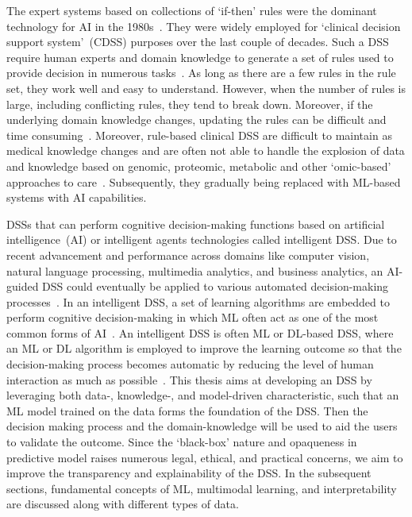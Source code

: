 \hspace*{3.5mm} The expert systems based on collections of `if-then' rules were the dominant technology for AI in the 1980s~\cite{davenport2019potential}. They were widely employed for `clinical decision support system'~(CDSS) purposes over the last couple of decades. Such a DSS require human experts and domain knowledge to generate a set of rules used to provide decision in numerous tasks~\cite{davenport2019potential}. 
As long as there are a few rules in the rule set, they work well and easy to understand. However, when the number of rules is large, including conflicting rules, they tend to break down. Moreover, if the underlying domain knowledge changes, updating the rules can be difficult and time consuming~\cite{davenport2019potential}. Moreover, rule-based clinical DSS are difficult to maintain as medical knowledge changes and are often not able to handle the explosion of data and knowledge based on genomic, proteomic, metabolic and other ‘omic-based’ approaches to care~\cite{das2020opportunities}.
Subsequently, they gradually being replaced with ML-based systems with AI capabilities. 

\hspace*{3.5mm} DSSs that can perform cognitive decision-making functions based on artificial intelligence~(AI) or intelligent agents technologies called intelligent DSS. Due to recent advancement and performance across domains like computer vision, natural language processing, multimedia analytics, and business analytics, an AI-guided DSS could eventually be applied to various automated decision-making processes~\cite{davenport2019potential}.  In an intelligent DSS, a set of learning algorithms are embedded to perform cognitive decision-making in which ML often act as one of the most common forms of AI~\cite{das2020opportunities}. An intelligent DSS is often ML or DL-based DSS, where an ML or DL algorithm is employed to improve the learning outcome so that the decision-making process becomes automatic by reducing the level of human interaction as much as possible~\cite{davenport2019potential}. 
This thesis aims at developing an DSS by leveraging both data-, knowledge-, and model-driven characteristic, such that an ML model trained on the data forms the foundation of the DSS. Then the decision making process and the domain-knowledge will be used to aid the users to validate the outcome. Since the `black-box' nature and opaqueness in predictive model raises numerous legal, ethical, and practical concerns, we aim to improve the transparency and explainability of the DSS. In the subsequent sections, fundamental concepts of ML, multimodal learning, and interpretability are discussed along with different types of data. %

